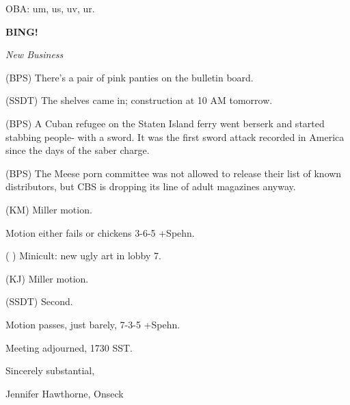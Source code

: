 \documentclass[12pt]{article}
\newcommand{\bing}{{\bf BING!} }
\newcommand{\goto}[1]{\bing \vskip 12pt \centerline{{\em{#1}}}}
\begin{document}
OBA: um, us, uv, ur.

\goto{New Business}

(BPS) There's a pair of pink panties on the bulletin board.

(SSDT) The shelves came in; construction at 10 AM tomorrow.

(BPS) A Cuban refugee on the Staten Island ferry went berserk and started stabbing people- with a sword. It was the first sword attack recorded in America since the days of the saber charge.

(BPS) The Meese porn committee was not allowed to release their list of known distributors, but CBS is dropping its line of adult magazines anyway.

(KM) Miller motion.

Motion either fails or chickens 3-6-5 +Spehn.

( ) Minicult: new ugly art in lobby 7.

(KJ) Miller motion.

(SSDT) Second.

Motion passes, just barely, 7-3-5 +Spehn.

\vspace{12pt}

\noindent
Meeting adjourned, 1730 SST.

\vspace{18pt}

\centerline{Sincerely substantial,}
\centerline{Jennifer Hawthorne, Onseck}
\end{document}
